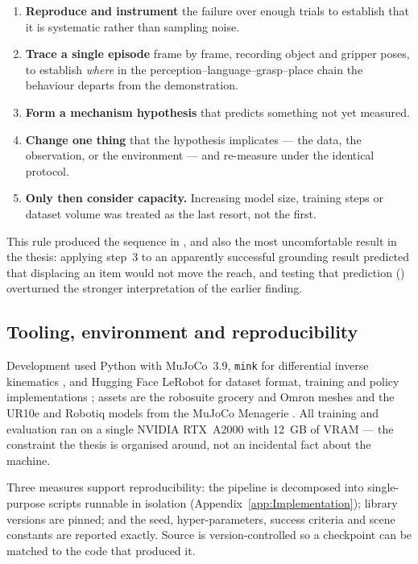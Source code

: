 \begin{enumerate}
    \item \textbf{Reproduce and instrument} the failure over enough trials to
    establish that it is systematic rather than sampling noise.
    \item \textbf{Trace a single episode} frame by frame, recording object and
    gripper poses, to establish \emph{where} in the perception--language--grasp--place
    chain the behaviour departs from the demonstration.
    \item \textbf{Form a mechanism hypothesis} that predicts something not yet
    measured.
    \item \textbf{Change one thing} that the hypothesis implicates --- the data, the
    observation, or the environment --- and re-measure under the identical protocol.
    \item \textbf{Only then consider capacity.} Increasing model size, training
    steps or dataset volume was treated as the last resort, not the first.
\end{enumerate}

This rule produced the sequence in , and also the most
uncomfortable result in the thesis: applying step~3 to an apparently successful
grounding result predicted that displacing an item would not move the reach, and testing
that prediction () overturned the stronger interpretation of
the earlier finding.

\subsection{Tooling, environment and reproducibility}
\label{sec:m-tooling}
Development used Python with MuJoCo~3.9, \texttt{mink} for differential inverse
kinematics \parencite{zakka2024mink}, and Hugging Face LeRobot for dataset format,
training and policy implementations \parencite{cadene2024lerobot}; assets are the
robosuite grocery and Omron meshes \parencite{zhu2020robosuite} and the UR10e and
Robotiq models from the MuJoCo Menagerie \parencite{deepmind2022menagerie}. All
training and evaluation ran on a single NVIDIA RTX~A2000 with \SI{12}{GB} of VRAM ---
the constraint the thesis is organised around, not an incidental fact about the machine.

Three measures support reproducibility: the pipeline is decomposed into single-purpose
scripts runnable in isolation (Appendix~\ref{app:Implementation}); library versions are
pinned; and the seed, hyper-parameters, success criteria and scene constants are
reported exactly. Source is version-controlled so a checkpoint can be matched to the
code that produced it.

